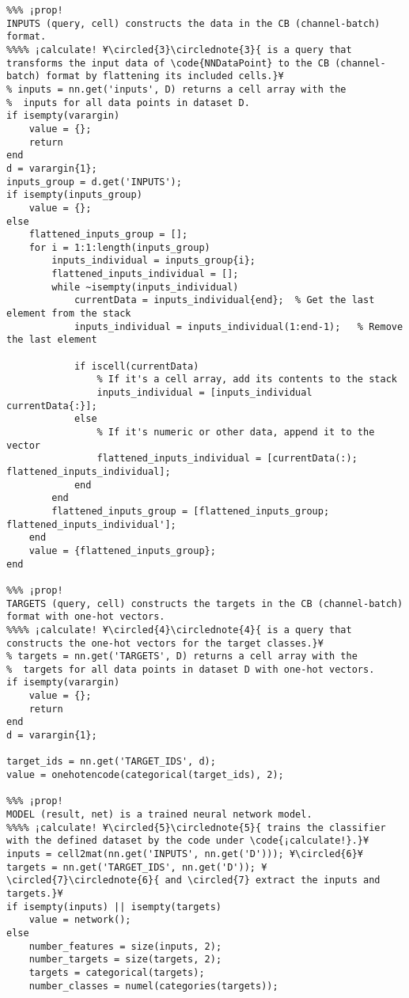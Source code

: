 \documentclass{tufte-handout}
\begin{document}
\begin{lstlisting}
%%% ¡prop!
INPUTS (query, cell) constructs the data in the CB (channel-batch) format.
%%%% ¡calculate! ¥\circled{3}\circlednote{3}{ is a query that transforms the input data of \code{NNDataPoint} to the CB (channel-batch) format by flattening its included cells.}¥
% inputs = nn.get('inputs', D) returns a cell array with the
%  inputs for all data points in dataset D.
if isempty(varargin)
    value = {};
    return
end
d = varargin{1};
inputs_group = d.get('INPUTS');
if isempty(inputs_group)
    value = {};
else
    flattened_inputs_group = [];
    for i = 1:1:length(inputs_group)
        inputs_individual = inputs_group{i};
        flattened_inputs_individual = [];
        while ~isempty(inputs_individual)
            currentData = inputs_individual{end};  % Get the last element from the stack
            inputs_individual = inputs_individual(1:end-1);   % Remove the last element

            if iscell(currentData)
                % If it's a cell array, add its contents to the stack
                inputs_individual = [inputs_individual currentData{:}];
            else
                % If it's numeric or other data, append it to the vector
                flattened_inputs_individual = [currentData(:); flattened_inputs_individual];
            end
        end
        flattened_inputs_group = [flattened_inputs_group; flattened_inputs_individual'];
    end
    value = {flattened_inputs_group};
end

%%% ¡prop!
TARGETS (query, cell) constructs the targets in the CB (channel-batch) format with one-hot vectors.
%%%% ¡calculate! ¥\circled{4}\circlednote{4}{ is a query that constructs the one-hot vectors for the target classes.}¥
% targets = nn.get('TARGETS', D) returns a cell array with the
%  targets for all data points in dataset D with one-hot vectors.
if isempty(varargin)
    value = {};
    return
end
d = varargin{1};

target_ids = nn.get('TARGET_IDS', d);
value = onehotencode(categorical(target_ids), 2);

%%% ¡prop!
MODEL (result, net) is a trained neural network model.
%%%% ¡calculate! ¥\circled{5}\circlednote{5}{ trains the classifier with the defined dataset by the code under \code{¡calculate!}.}¥
inputs = cell2mat(nn.get('INPUTS', nn.get('D'))); ¥\circled{6}¥
targets = nn.get('TARGET_IDS', nn.get('D')); ¥\circled{7}\circlednote{6}{ and \circled{7} extract the inputs and targets.}¥
if isempty(inputs) || isempty(targets)
    value = network();
else
    number_features = size(inputs, 2);
    number_targets = size(targets, 2);
    targets = categorical(targets); 
    number_classes = numel(categories(targets));
    

\end{lstlisting}
\end{document}
